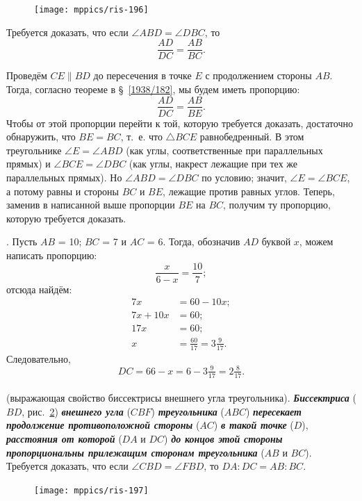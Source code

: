 \documentclass[oneside]{book}
\begin{document}
\begin{figure}
\centering
\texttt{[image: mppics/ris-196]}
\caption{}\label{1938/ris-196}
\end{figure}

Требуется доказать, что если $\angle ABD=\angle DBC$, то 
\[\frac{AD}{DC}=\frac{AB}{BC}.\]

Проведём $CE \parallel BD$ до пересечения в точке $E$ с продолжением стороны $AB$.
Тогда, согласно теореме в §~\ref{1938/182}, мы будем иметь пропорцию:
\[\frac{AD}{DC}=\frac{AB}{BE}.\]
Чтобы от этой пропорции перейти к той, которую требуется доказать, достаточно обнаружить, что $BE=BC$, т.~е. что $\triangle BCE$ равнобедренный.
В этом треугольнике $\angle E=\angle ABD$ (как углы, соответственные при параллельных прямых) и $\angle BCE = \angle DBC$ (как углы, накрест лежащие при тех же параллельных прямых).
Но $\angle ABD=\angle DBC$ по условию;
значит, $\angle E = \angle BCE$, а потому равны и стороны $BC$ и $BE$, лежащие против равных углов.
Теперь, заменив в написанной выше пропорции $BE$ на $BC$, получим ту пропорцию, которую требуется доказать.

\medskip

.
Пусть $AB$ = 10;
$BC$ = 7 и $AC$ = 6.
Тогда, обозначив $AD$ буквой $x$, можем написать пропорцию:
\[\frac{x}{6 - x} = \frac{10}7;\]
отсюда найдём:
\begin{align*}
7x&=60-10x;
\\
7x+10x&=60;
\\
17x&=60;
\\
x&=\tfrac{60}{17}=3\tfrac9{17}.
\end{align*}
Следовательно,
\[DC=66-x=6-3\tfrac9{17}=2\tfrac8{17}.\]

\paragraph{}\label{1938/187}
 (выражающая свойство биссектрисы внешнего угла треугольника).
\textbf{\emph{Биссектриса}} ($BD$, рис.~\ref{1938/ris-197}) \textbf{\emph{внешнего угла}} ($CBF$) \textbf{\emph{треугольника}} ($ABC$) \textbf{\emph{пересекает продолжение противоположной стороны}} ($AC$) \textbf{\emph{в такой точке}} ($D$), \textbf{\emph{расстояния от которой}} ($DA$ и $DC$) \textbf{\emph{до концов этой стороны пропорциональны прилежащим сторонам треугольника}} ($AB$ и $BC$).
Требуется доказать, что если $\angle CBD=\angle FBD$, то $DA:DC=AB:BC$.

\begin{figure}
\centering
\texttt{[image: mppics/ris-197]}
\caption{}\label{1938/ris-197}
\end{figure}
\end{document}
